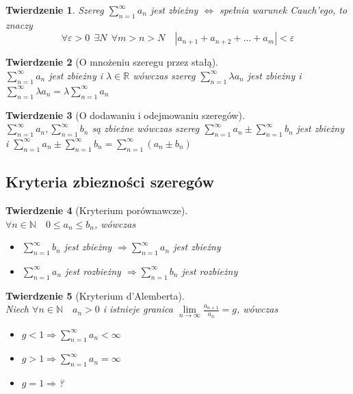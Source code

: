 \documentclass[12pt,a4paper]{article}
\newtheorem{tw}{Twierdzenie}
\theoremstyle{definition}
\begin{document}
\begin{tw}
Szereg $\sum\limits_{n=1}^\infty a_n$ jest zbieżny $\Leftrightarrow$ spełnia warunek Cauch'ego, to znaczy
$$
\forall \varepsilon > 0 ~~\exists N ~~\forall m > n > N \quad |a_{n+1} + a_{n+2} + \dots + a_m| < \varepsilon
$$
\end{tw}

\begin{tw}[O mnożeniu szeregu przez stałą]~\\
$\sum\limits_{n=1}^\infty a_n$ jest zbieżny i $\lambda\in\mathbb{R}$ wówczas szereg $\sum\limits_{n=1}^\infty \lambda a_n$ jest zbieżny i $\sum\limits_{n=1}^\infty \lambda a_n = \lambda \sum\limits_{n=1}^\infty a_n$
\end{tw}
\begin{tw}[O dodawaniu i odejmowaniu szeregów]~\\
$\sum\limits_{n=1}^\infty a_n, \sum\limits_{n=1}^\infty b_n$ są zbieżne wówczas szereg $\sum\limits_{n=1}^\infty a_n \pm \sum\limits_{n=1}^\infty b_n$ jest zbieżny i $\sum\limits_{n=1}^\infty a_n \pm \sum\limits_{n=1}^\infty b_n = \sum\limits_{n=1}^\infty (a_n \pm b_n)$
\end{tw}

\subsection{Kryteria zbiezności szeregów}

\begin{tw}[Kryterium porównawcze]~\\
$\forall n\in\mathbb{N} \quad 0 \leqslant a_n \leqslant b_n$, wówczas
\begin{itemize}
	\item $\sum\limits_{n=1}^\infty b_n$ jest zbieżny $\Rightarrow \sum\limits_{n=1}^\infty a_n$ jest zbieżny
	\item $\sum\limits_{n=1}^\infty a_n$ jest rozbieżny $\Rightarrow \sum\limits_{n=1}^\infty b_n$ jest rozbieżny
\end{itemize}
\end{tw}

\begin{tw}[Kryterium d'Alemberta]~\\
Niech $\forall n\in\mathbb{N} \quad a_n > 0$ i istnieje granica 
$\lim\limits_{n\to\infty} \frac{a_{n+1}}{a_n} = g$, wówczas
\begin{itemize}
	\item $g < 1 \Rightarrow \sum\limits_{n=1}^\infty a_n < \infty$
	\item $g > 1 \Rightarrow \sum\limits_{n=1}^\infty a_n = \infty$
	\item $g = 1 \Rightarrow $?
\end{itemize}
\end{tw}
\end{document}
